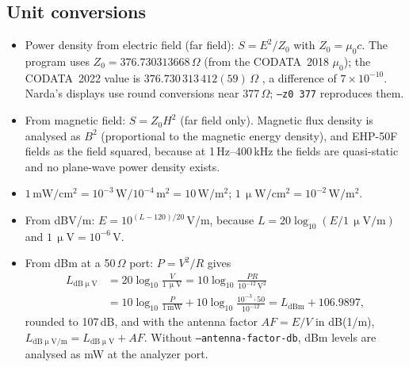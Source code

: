 \documentclass[10pt,letterpaper]{article}
\numberwithin{equation}{section}
\begin{document}
\subsection{Unit conversions}\label{sec:units}
\begin{itemize}
\item Power density from electric field (far field):
$S = E^2/Z_0$ with $Z_0 = \mu_0 c$. The program uses
$Z_0 = 376.730313668\,\Omega$ (from the CODATA~2018 $\mu_0$); the CODATA~2022 value
is $376.730\,313\,412(59)\,\Omega$ \cite{B32}, a difference of
$7\times10^{-10}$. Narda's displays use round conversions near 377\,$\Omega$;
\texttt{--z0 377} reproduces them.
\item From magnetic field: $S = Z_0 H^2$ (far field only). Magnetic flux
density is analysed as $B^2$ (proportional to the magnetic energy density),
and EHP-50F fields as the field squared, because at 1\,Hz--400\,kHz the fields
are quasi-static and no plane-wave power density exists.
\item $1\,\mathrm{mW/cm^2} = 10^{-3}\,\mathrm{W}/10^{-4}\,\mathrm{m^2} = 10\,\mathrm{W/m^2}$;
$1\,\mathrm{\upmu W/cm^2} = 10^{-2}\,\mathrm{W/m^2}$.
\item From dB\textmu V/m: $E = 10^{(L-120)/20}$\,V/m, because
$L = 20\log_{10}(E/1\,\mathrm{\upmu V/m})$ and $1\,\mathrm{\upmu V} = 10^{-6}\,\mathrm{V}$.
\item From dBm at a 50\,$\Omega$ port: $P = V^2/R$ gives
\begin{align}
L_{\mathrm{dB\upmu V}} &= 20\log_{10}\frac{V}{1\,\mathrm{\upmu V}}
 = 10\log_{10}\frac{P R}{10^{-12}\,\mathrm{V^2}} \nonumber\\
 &= 10\log_{10}\frac{P}{1\,\mathrm{mW}} + 10\log_{10}\frac{10^{-3}\cdot 50}{10^{-12}}
 = L_\mathrm{dBm} + 106.9897,
\end{align}
rounded to 107\,dB, and with the antenna factor $\mathit{AF} = E/V$ in dB(1/m),
$L_{\mathrm{dB\upmu V/m}} = L_{\mathrm{dB\upmu V}} + \mathit{AF}$.
Without \texttt{--antenna-factor-db}, dBm levels are analysed as mW at the
analyzer port.
\end{itemize}
\end{document}
